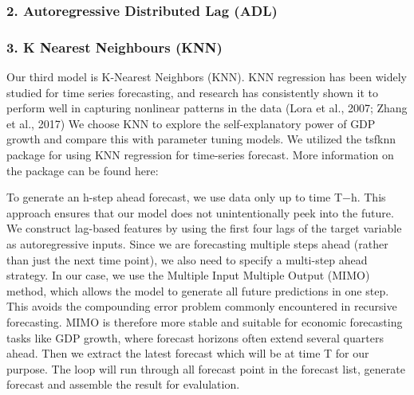 \documentclass[
]{article}
\begin{document}
\hypertarget{autoregressive-distributed-lag-adl}{%
\subsubsection{2. Autoregressive Distributed Lag
(ADL)}\label{autoregressive-distributed-lag-adl}}

\hypertarget{k-nearest-neighbours-knn}{%
\subsubsection{3. K Nearest Neighbours
(KNN)}\label{k-nearest-neighbours-knn}}

Our third model is K-Nearest Neighbors (KNN). KNN regression has been
widely studied for time series forecasting, and research has
consistently shown it to perform well in capturing nonlinear patterns in
the data (Lora et al., 2007; Zhang et al., 2017) We choose KNN to
explore the self-explanatory power of GDP growth and compare this with
parameter tuning models. We utilized the tsfknn package for using KNN
regression for time-series forecast. More information on the package can
be found here:

To generate an h-step ahead forecast, we use data only up to time T−h.
This approach ensures that our model does not unintentionally peek into
the future. We construct lag-based features by using the first four lags
of the target variable as autoregressive inputs. Since we are
forecasting multiple steps ahead (rather than just the next time point),
we also need to specify a multi-step ahead strategy. In our case, we use
the Multiple Input Multiple Output (MIMO) method, which allows the model
to generate all future predictions in one step. This avoids the
compounding error problem commonly encountered in recursive forecasting.
MIMO is therefore more stable and suitable for economic forecasting
tasks like GDP growth, where forecast horizons often extend several
quarters ahead. Then we extract the latest forecast which will be at
time T for our purpose. The loop will run through all forecast point in
the forecast list, generate forecast and assemble the result for
evalulation.
\end{document}
